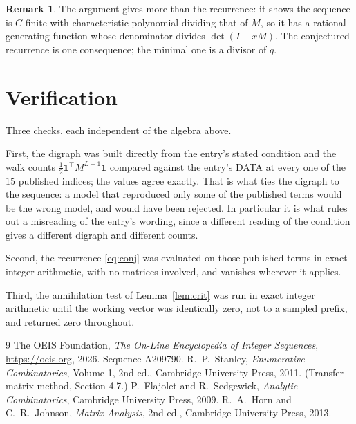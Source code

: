 \documentclass[11pt,a4paper]{article}
\theoremstyle{plain}
\theoremstyle{definition}
\newtheorem{remark}[theorem]{Remark}
\begin{document}
\begin{remark}
The argument gives more than the recurrence: it shows the sequence is $C$-finite with
characteristic polynomial dividing that of $M$, so it has a rational generating function
whose denominator divides $\det(I-xM)$. The conjectured recurrence is one consequence; the
minimal one is a divisor of $q$.
\end{remark}

\section{Verification}

Three checks, each independent of the algebra above.

First, the digraph was built directly from the entry's stated condition and the walk counts
$\tfrac1{2}\mathbf{1}^{\!\top}M^{L-1}\mathbf{1}$ compared against the entry's DATA at
every one of the $15$ published indices; the values agree exactly. That is what ties
the digraph to the sequence: a model that reproduced only some of the published terms would
be the wrong model, and would have been rejected. In particular it is what rules out a
misreading of the entry's wording, since a different reading of the condition gives a
different digraph and different counts.

Second, the recurrence \eqref{eq:conj} was evaluated on those published terms in exact
integer arithmetic, with no matrices involved, and vanishes wherever it applies.

Third, the annihilation test of Lemma~\ref{lem:crit} was run in exact integer arithmetic
until the working vector was identically zero, not to a sampled prefix, and returned zero
throughout.

\begin{thebibliography}{9}
 The OEIS Foundation, \emph{The On-Line Encyclopedia of Integer
Sequences}, \url{https://oeis.org}, 2026. Sequence A209790.
 R.~P.~Stanley, \emph{Enumerative Combinatorics}, Volume 1, 2nd ed.,
Cambridge University Press, 2011. (Transfer-matrix method, Section 4.7.)
 P.~Flajolet and R.~Sedgewick, \emph{Analytic Combinatorics}, Cambridge
University Press, 2009.
 R.~A.~Horn and C.~R.~Johnson, \emph{Matrix Analysis}, 2nd ed., Cambridge
University Press, 2013.
\end{thebibliography}
\end{document}
